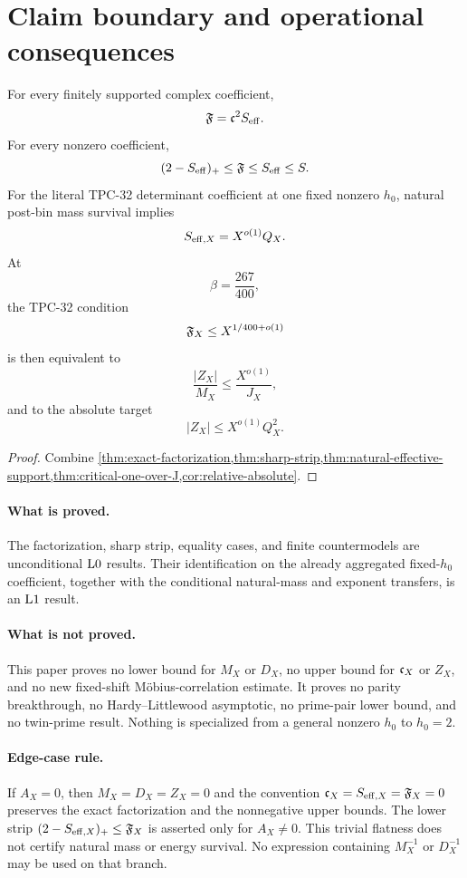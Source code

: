 \section{Claim boundary and operational consequences}
\label{sec:claim-boundary}

\begin{theorem}
\label{thm:audited-conclusion}
For every finitely supported complex coefficient,
\[
 \mathfrak F=\mathfrak c^2S_{\mathrm{eff}}.
\]
For every nonzero coefficient,
\[
 (2-S_{\mathrm{eff}})_+\le\mathfrak F\le S_{\mathrm{eff}}\le S.
\]
For the literal TPC-32 determinant coefficient at one fixed nonzero
\(h_0\), natural post-bin mass survival implies
\[
 S_{\mathrm{eff},X}=X^{o(1)}Q_X.
\]
At
\[
 \beta=\frac{267}{400},
\]
the TPC-32 condition
\[
 \mathfrak F_X\le X^{1/400+o(1)}
\]
is then equivalent to
\[
 \frac{|Z_X|}{M_X}
 \le\frac{X^{o(1)}}{J_X},
\]
and to the absolute target
\[
 |Z_X|\le X^{o(1)}Q_X^2.
\]
\end{theorem}

\begin{proof}
Combine
\cref{thm:exact-factorization,thm:sharp-strip,thm:natural-effective-support,thm:critical-one-over-J,cor:relative-absolute}.
\end{proof}

\paragraph{What is proved.}
The factorization, sharp strip, equality cases, and finite
countermodels are unconditional \(\mathrm{L0}\) results.  Their
identification on the already aggregated fixed-\(h_0\) coefficient,
together with the conditional natural-mass and exponent transfers,
is an \(\mathrm{L1}\) result.

\paragraph{What is not proved.}
This paper proves no lower bound for \(M_X\) or \(D_X\), no upper
bound for \(\mathfrak c_X\) or \(Z_X\), and no new fixed-shift
M{\"o}bius-correlation estimate.  It proves no parity breakthrough, no
Hardy--Littlewood asymptotic, no prime-pair lower bound, and no
twin-prime result.  Nothing is specialized from a general nonzero
\(h_0\) to \(h_0=2\).

\paragraph{Edge-case rule.}
If \(A_X=0\), then \(M_X=D_X=Z_X=0\) and the convention
\(\mathfrak c_X=S_{\mathrm{eff},X}=\mathfrak F_X=0\) preserves the exact factorization and
the nonnegative upper bounds.  The lower strip
\((2-S_{\mathrm{eff},X})_+\le\mathfrak F_X\) is asserted only for \(A_X\ne0\).
This trivial flatness does not certify natural mass or energy
survival.  No expression containing \(M_X^{-1}\) or \(D_X^{-1}\)
may be used on that branch.

